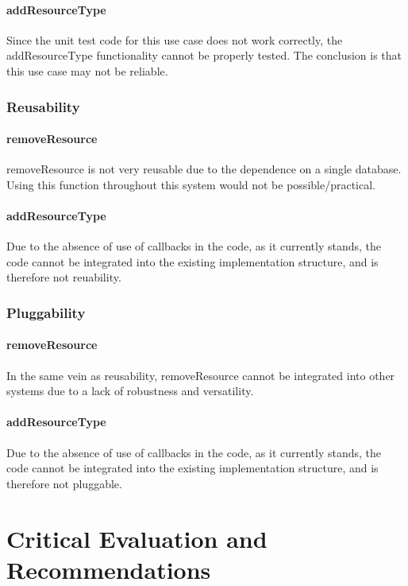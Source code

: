 \documentclass[a4paper]{article}
\begin{document}
\paragraph{addResourceType}
Since the unit test code for this use case does not work correctly, 
the addResourceType functionality cannot be properly tested.
The conclusion is that this use case may not be reliable. 

\subsubsection {Reusability}

\paragraph{removeResource}
removeResource is not very reusable due to the dependence on a single database. Using this function throughout this system would not be possible/practical.

\paragraph{addResourceType}
Due to the absence of use of callbacks in the code, as it currently stands, the code cannot be 
integrated into the existing implementation structure, and is therefore not reuability.

\subsubsection {Pluggability}

\paragraph{removeResource}
In the same vein as reusability, removeResource cannot be integrated into other systems due to a lack of robustness and versatility.

\paragraph{addResourceType}
Due to the absence of use of callbacks in the code, as it currently stands, the code cannot be 
integrated into the existing implementation structure, and is therefore not pluggable.

\section {Critical Evaluation and Recommendations}
\end{document}
